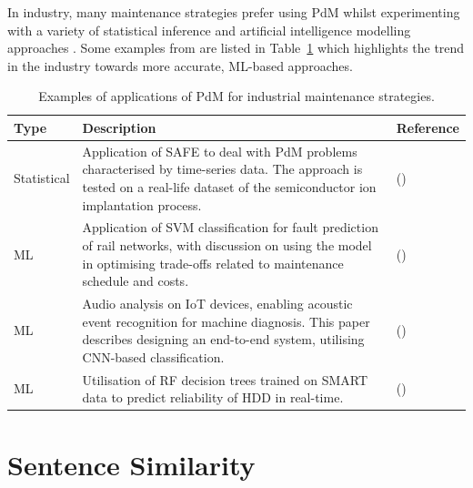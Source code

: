 \documentclass[10pt,oneside]{report}
\begin{document}
In industry, many maintenance strategies prefer using PdM whilst experimenting with a variety of statistical inference and artificial intelligence modelling approaches \cite{mobley2002introduction, jezzini2013effects}. Some examples from \cite{carvalho2019systematic} are listed in Table~\ref{tab:pdmPaperTable} which highlights the trend in the industry towards more accurate, ML-based approaches.

\begin{table}[htbp]
    \fontsize{8}{12}\selectfont
    \centering
    \caption{\fontsize{9}{10}\selectfont Examples of applications of PdM for industrial maintenance strategies.}
    \label{tab:pdmPaperTable}
    \begin{adjustbox}{max width=\textwidth}
    \begin{tabular}{p{1.5cm} p{8.5cm} p{3cm}}
        \toprule
        \textbf{Type} & \textbf{Description} & \textbf{Reference} \\
        \midrule
        Statistical & Application of SAFE to deal with PdM problems characterised by time-series data. The approach is tested on a real-life dataset of the semiconductor ion implantation process. & (\citet{susto2016dealing})\\
        ML & Application of SVM classification for fault prediction of rail networks, with discussion on using the model in optimising trade-offs related to maintenance schedule and costs. & (\citet{li2014improving})\\
        ML & Audio analysis on IoT devices, enabling acoustic event recognition for machine diagnosis. This paper describes designing an end-to-end system, utilising CNN-based classification. & (\citet{pan2017cognitive})  \\
        ML & Utilisation of RF decision trees trained on SMART data to predict reliability of HDD in real-time. & (\citet{su2018real}) \\
        \bottomrule
    \end{tabular}
    \end{adjustbox}
\end{table}


\section{Sentence Similarity}\label{sec:sentenceSimilarity}
\end{document}

